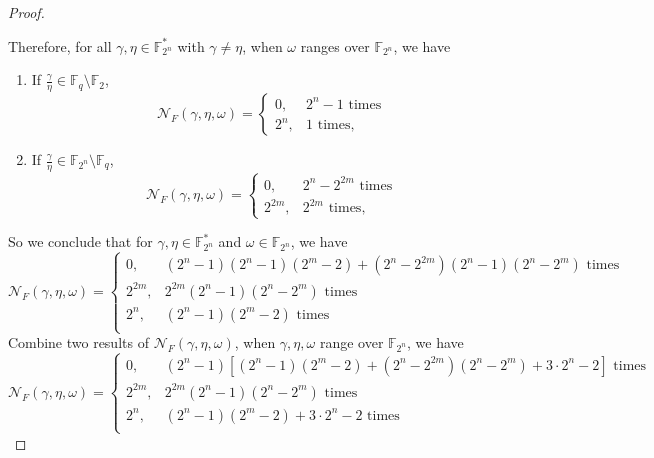 \documentclass[12 pt]{article}
\def\F{{\mathbb F}}
\begin{document}
\begin{proof}
\begin{enumerate}[label=(\arabic{*})]
  \end{enumerate}
  Therefore, for all $ \gamma,\eta\in\F_{2^n}^* $ with $ \gamma\ne\eta $, when $ \omega $ ranges over $ \F_{2^n} $, we have 
  \begin{enumerate}[label=(\arabic{*})]
    \item If $ \frac{\gamma}{\eta}\in\F_q\setminus\F_2 $, 
    \begin{equation}
      \mathcal{N}_F(\gamma,\eta,\omega)=\begin{cases}
        0,&2^n-1\text{~times}\\
        2^{n},&1\text{~times},
      \end{cases}
    \end{equation}
    \item If $ \frac{\gamma}{\eta}\in\F_{2^n}\setminus\F_q $, 
    \begin{equation}
      \mathcal{N}_F(\gamma,\eta,\omega)=\begin{cases}
        0,&2^n-2^{2m}\text{~times}\\
        2^{2m},&2^{2m}\text{~times},
      \end{cases}
    \end{equation}
  \end{enumerate}
  So we conclude that for $ \gamma,\eta\in\F_{2^n}^* $ and $ \omega\in\F_{2^n} $, we have 
  \[\mathcal{N}_F(\gamma,\eta,\omega)=\begin{cases}
    0,&(2^n-1)(2^n-1)(2^m-2)+(2^n-2^{2m})(2^n-1)(2^n-2^m)\text{~times}\\
    2^{2m},&2^{2m}(2^n-1)(2^n-2^m)\text{~times}\\
    2^n,&(2^n-1)(2^m-2)\text{~times}\\
  \end{cases}\]
  Combine two results of $ \mathcal{N}_F(\gamma,\eta,\omega)  $, 
  when $ \gamma,\eta,\omega $ range over $ \F_{2^n} $, we have
  \[\mathcal{N}_F(\gamma,\eta,\omega)=\begin{cases}
    0,&(2^n-1)\left[ (2^n-1)(2^m-2)+(2^n-2^{2m})(2^n-2^m)+3\cdot 2^n-2 \right]\text{~times}\\
    2^{2m},&2^{2m}(2^n-1)(2^n-2^m)\text{~times}\\
    2^n,&(2^n-1)(2^m-2)+3\cdot 2^n-2\text{~times}\\
  \end{cases}\]
\end{proof}








\end{document}
